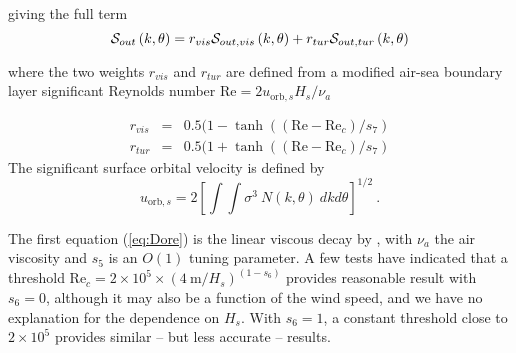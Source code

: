 \noindent
giving the full term 
\begin{equation}
{\cal S}_{out} \left(k,\theta\right) = r_{vis} {\cal S}_{out,vis}\left(k,\theta\right)  + 
 r_{tur} {\cal S}_{out,tur}\left(k,\theta\right)  
 \label{eq:swell_comb}
\end{equation}

\noindent
where the two weights $ r_{vis} $ and $r_{tur}$ are defined from 
a modified  air-sea boundary layer significant Reynolds number $\mathrm{Re} = 2
u_{\mathrm{orb},s} H_s / \nu_{a}$ 

\begin{eqnarray}
 r_{vis} &=& 0.5 (1- \tanh((\mathrm{Re}-\mathrm{Re}_{c})/s_7) \\
 r_{tur}&=& 0.5 (1+ \tanh((\mathrm{Re}-\mathrm{Re}_{c})/s_7) 
\end{eqnarray}
The significant surface orbital velocity is defined by
\begin{equation} u_{\mathrm{orb},s} = 2 \left [  \int \!\!\!\! \int
      \sigma^3 \: N(k,\theta) \: dk d\theta \right ] ^{1/2}
      \: . \label{eq:ub_orbs} \end{equation}

\noindent 
The first equation (\ref{eq:Dore}) is the linear viscous decay by
\cite{art:Dore78}, with $\nu_a$ the air viscosity and $s_5$ is an $O(1)$
tuning parameter. A few tests have indicated that a threshold Re$_{c}=2 \times
10^5 \times (4~\mathrm{m}/H_s)^{(1-s_6)}$ provides reasonable result with
$s_6=0$, although it may also be a function of the wind speed, and we have no
explanation for the dependence on $H_s$.  With $s_6=1$, a constant threshold
close to $2 \times 10^5$ provides similar -- but less accurate -- results.


